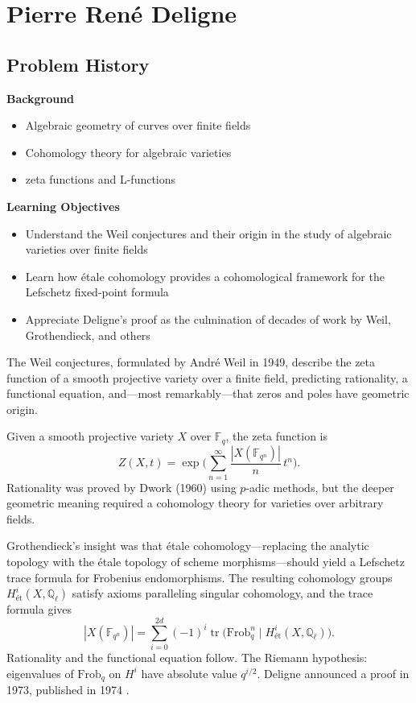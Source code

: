 \chapter{Pierre René Deligne}

\section*{Problem History}

\begin{prereqs}
\noindent \textbf{Background}
\begin{itemize}
\item Algebraic geometry of curves over finite fields
\item Cohomology theory for algebraic varieties
\item zeta functions and L-functions
\end{itemize}
\end{prereqs}

\begin{objectives}
\noindent \textbf{Learning Objectives}
\begin{itemize}
\item Understand the Weil conjectures and their origin in the study of algebraic varieties over finite fields
\item Learn how étale cohomology provides a cohomological framework for the Lefschetz fixed-point formula
\item Appreciate Deligne's proof as the culmination of decades of work by Weil, Grothendieck, and others
\end{itemize}
\end{objectives}

The Weil conjectures, formulated by André Weil in 1949, describe the
zeta function of a smooth projective variety over a finite field,
predicting rationality, a functional equation, and---most
remarkably---that zeros and poles have geometric origin.

Given a smooth projective variety $X$ over $\mathbb{F}_q$, the zeta
function is
\[
Z(X, t) = \exp\!\Bigg(\sum_{n=1}^{\infty} \frac{|X(\mathbb{F}_{q^n})|}{n}\, t^n\Bigg).
\]
Rationality was proved by Dwork (1960) using $p$-adic methods, but the
deeper geometric meaning required a cohomology theory for varieties over
arbitrary fields.

Grothendieck's insight was that \'etale cohomology---replacing the
analytic topology with the \'etale topology of scheme morphisms---should
yield a Lefschetz trace formula for Frobenius endomorphisms. The
resulting cohomology groups $H^i_{\text{ét}}(X, \mathbb{Q}_\ell)$ satisfy
axioms paralleling singular cohomology, and the trace formula gives
\[
|X(\mathbb{F}_{q^n})| = \sum_{i=0}^{2d} (-1)^i \operatorname{tr}\!\big(\text{Frob}_q^n \mid H^i_{\text{ét}}(X, \mathbb{Q}_\ell)\big).
\]
Rationality and the functional equation follow. The Riemann hypothesis:
eigenvalues of $\text{Frob}_q$ on $H^i$ have absolute value $q^{i/2}$.
Deligne announced a proof in 1973, published in 1974 \cite{deligne1974}.

